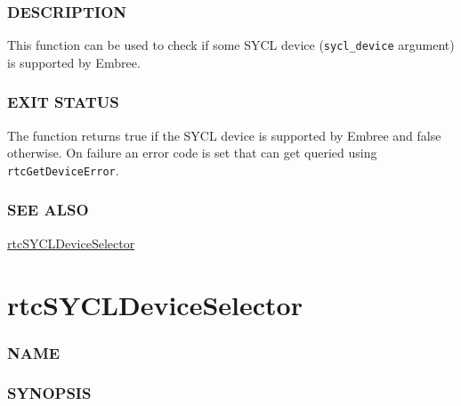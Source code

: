 \subsubsection{DESCRIPTION}\label{description}

This function can be used to check if some SYCL device
(\texttt{sycl\_device} argument) is supported by Embree.

\subsubsection{EXIT STATUS}\label{exit-status}

The function returns true if the SYCL device is supported by Embree and
false otherwise. On failure an error code is set that can get queried
using \texttt{rtcGetDeviceError}.

\subsubsection{SEE ALSO}\label{see-also}

\hyperref[rtcsycldeviceselector]{rtcSYCLDeviceSelector}

\pagebreak

\section{rtcSYCLDeviceSelector}\label{rtcsycldeviceselector}

\subsubsection{NAME}\label{name}

\begin{Shaded}
\begin{Highlighting}[]
\OperatorTok{{-}}
\end{Highlighting}
\end{Shaded}

\subsubsection{SYNOPSIS}\label{synopsis}

\begin{Shaded}
\begin{Highlighting}[]

\OperatorTok{(}\OperatorTok{::}\OperatorTok{);}
\end{Highlighting}
\end{Shaded}

